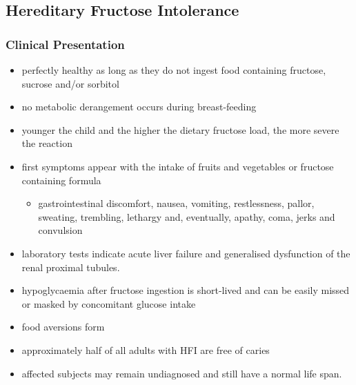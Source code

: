 \documentclass{scrartcl}
\begin{document}
\subsection{Hereditary Fructose Intolerance}
\label{sec:orgba6359b}
\subsubsection{Clinical Presentation}
\label{sec:orga0ffadd}
\begin{itemize}
\item perfectly healthy as long as they do not ingest food containing fructose, sucrose and/or sorbitol
\item no metabolic derangement occurs during breast-feeding
\item younger the child and the higher the dietary fructose load, the more severe the reaction
\item first symptoms appear with the intake of fruits and vegetables or fructose containing formula
\begin{itemize}
\item gastrointestinal discomfort, nausea, vomiting, restlessness,
pallor, sweating, trembling, lethargy and, eventually, apathy,
coma, jerks and convulsion
\end{itemize}
\item laboratory tests indicate acute liver failure and generalised dysfunction of the renal proximal tubules.
\item hypoglycaemia after fructose ingestion is short-lived and can be easily missed or masked by concomitant glucose intake
\item food aversions form
\item approximately half of all adults with HFI are free of caries
\item affected subjects may remain undiagnosed and still have a normal life span.
\end{itemize}
\end{document}
